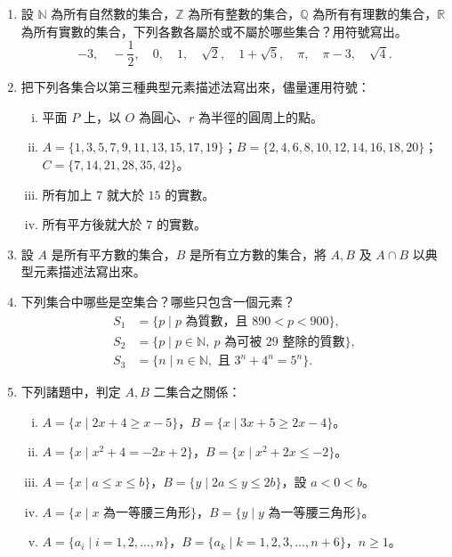 \begin{enumerate}[1., leftmargin=2em]
  \item 設 $\mathbb{N}$ 為所有自然數的集合，$\mathbb{Z}$ 為所有整數的集合，$\mathbb{Q}$ 為所有有理數的集合，$\mathbb{R}$ 為所有實數的集合，下列各數各屬於或不屬於哪些集合？用符號寫出。
  \begin{equation*}
    -3, \quad -\frac{1}{2}, \quad 0, \quad 1, \quad \sqrt{2}, \quad 1+\sqrt{5}, \quad \pi, \quad \pi - 3, \quad \sqrt{4}.
  \end{equation*}
  \item 把下列各集合以第三種典型元素描述法寫出來，儘量運用符號：
  \begin{enumerate}[(i)]
    \item 平面 $P$ 上，以 $O$ 為圓心、$r$ 為半徑的圓周上的點。
    \item $A = \{1, 3, 5, 7, 9, 11, 13, 15, 17, 19\}$；$B = \{2, 4, 6, 8, 10, 12, 14, 16, 18, 20\}$；$C = \{7, 14, 21, 28, 35, 42\}$。
    \item 所有加上 $7$ 就大於 $15$ 的實數。
    \item 所有平方後就大於 $7$ 的實數。
  \end{enumerate}
  \item 設 $A$ 是所有平方數的集合，$B$ 是所有立方數的集合，將 $A, B$ 及 $A \cap B$ 以典型元素描述法寫出來。
  \item 下列集合中哪些是空集合？哪些只包含一個元素？
  \begin{align*}
    S_1 &= \{p \mid p \text{ 為質數，且 } 890 < p < 900\}, \\
    S_2 &= \{p \mid p \in \mathbb{N}, \ p \text{ 為可被 } 29 \text{ 整除的質數}\}, \\
    S_3 &= \{n \mid n \in \mathbb{N}, \text{ 且 } 3^n + 4^n = 5^n\}.
  \end{align*}
  \item 下列諸題中，判定 $A, B$ 二集合之關係：
  \begin{enumerate}[(i)]
    \item $A = \{x \mid 2x+4 \ge x-5\}$，$B = \{x \mid 3x+5 \ge 2x-4\}$。
    \item $A = \{x \mid x^2 + 4 = -2x+2\}$，$B = \{x \mid x^2 + 2x \le -2\}$。
    \item $A = \{x \mid a \le x \le b\}$，$B = \{y \mid 2a \le y \le 2b\}$，設 $a < 0 < b$。
    \item $A = \{x \mid x \text{ 為一等腰三角形}\}$，$B = \{y \mid y \text{ 為一等腰三角形}\}$。
    \item $A = \{a_i \mid i=1, 2, \dots, n\}$，$B = \{a_k \mid k=1, 2, 3, \dots, n+6\}$，$n \ge 1$。

\end{enumerate}
\end{enumerate}
